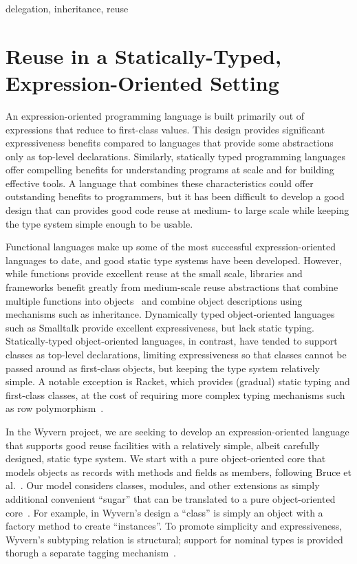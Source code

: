 \documentclass[preprint]{sigplanconf}
\begin{document}

%

\keywords
delegation, inheritance, reuse

\section{Reuse in a Statically-Typed, Expression-Oriented Setting}

An expression-oriented programming language is built primarily out of
expressions that reduce to first-class values.  This design provides
significant expressiveness benefits compared to languages that provide
some abstractions only as top-level declarations.  Similarly, statically
typed programming languages offer compelling benefits for understanding
programs at scale and for building effective tools.  A language that
combines these characteristics could offer outstanding benefits to
programmers, but it has been difficult to develop a good design that
can provides good code reuse at medium- to large scale while keeping
the type system simple enough to be usable.

Functional languages make up some of the most successful
expression-oriented languages to date, and good static type systems
have been developed.  However, while functions provide excellent reuse
at the small scale, libraries and frameworks benefit greatly from
medium-scale reuse abstractions that combine multiple functions into
objects~\cite{Aldrich:2013:PIW:2509578.2514738} and combine object
descriptions using mechanisms such as inheritance.  Dynamically typed
object-oriented languages such as Smalltalk provide excellent
expressiveness, but lack static typing.  Statically-typed
object-oriented languages, in contrast, have tended to support classes
as top-level declarations, limiting expressiveness so that classes
cannot be passed around as first-class objects, but keeping the type
system relatively simple.  A notable exception is Racket, which
provides (gradual) static typing and first-class classes, at the cost
of requiring more complex typing mechanisms such as row
polymorphism~\cite{TSDTF}.

In the Wyvern project, we are seeking to develop an expression-oriented
language that supports good reuse facilities with a relatively simple,
albeit carefully designed, static type system.  We start with a pure
object-oriented core that models objects as records with methods and
fields as members, following Bruce et al.~\cite{BCP99}. Our model
considers classes, modules, and other extensions as simply additional
convenient ``sugar'' that can be translated to a pure object-oriented
core~\cite{Nistor:2013:WST:2489828.2489830}.  For example, in Wyvern's
design a ``class'' is simply an object with a factory method to create
``instances''.  To promote simplicity and expressiveness, Wyvern's
subtyping relation is structural; support for nominal types is
provided thorugh a separate tagging
mechanism~\cite{DBLP:conf/ecoop/LeeASP15}.
\end{document}
